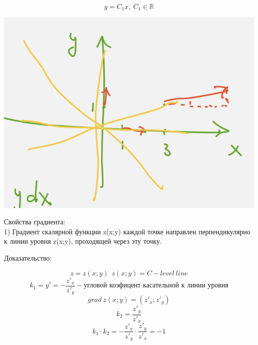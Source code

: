 \documentclass{article}
\begin{document}
\begin{equation*}
    y= C_1x,\ C_1\in \mathbb{R}
\end{equation*}
\begin{center}
    \includegraphics[width=.3\textwidth]{ans_grad.png} 
\end{center}
Свойства градиента:\\
1) Градиент скалярной функции z(x;y) каждой точке направлен перпендикулярно к линии уровня z(x;y), проходящей через эту точку.

Доказательство:

\begin{equation*}
    z = z(x;y)\ \ z(x;y) = C - level\ line
\end{equation*}
\begin{equation*}
    k_1 = y' = -\frac{z'_x}{z'_y} - \text{угловой коэфицент касательной к линии уровня}
\end{equation*}
\begin{equation*}
    grad\ z(x;y) = (z'_x; z'_y)
\end{equation*}
\begin{equation*}
    k_2 = \frac{z'_y}{z'_x}
\end{equation*}
\begin{equation*}
    k_1\cdot k_2 = -\frac{z'_x}{z'_y}\cdot \frac{z'_y}{z'_x} = -1
\end{equation*}
\end{document}
